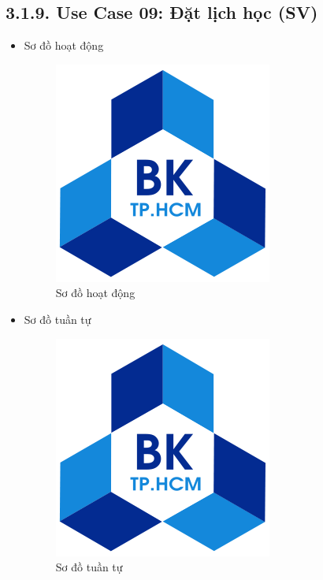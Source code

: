 \subsection*{3.1.9. Use Case 09: Đặt lịch học (SV)}
\begin{itemize}
    \item Sơ đồ hoạt động
    \begin{figure}[H]
    \centering
    \includegraphics[scale=0.5 ]{Picture/hcmut.png}
    \caption{Sơ đồ hoạt động }
    \end{figure}
    \item Sơ đồ tuần tự
    \begin{figure}[H]
    \centering
    \includegraphics[scale=0.5 ]{Picture/hcmut.png}
    \caption{Sơ đồ tuần tự }
    \end{figure}
\end{itemize}
